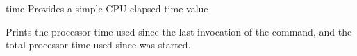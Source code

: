 \begin{nusmvCommand} {time} {Provides a simple CPU elapsed time value}
 

Prints the processor time used since the last invocation of the 
command, and the total processor time used since \nusmv was started.

\end{nusmvCommand}
